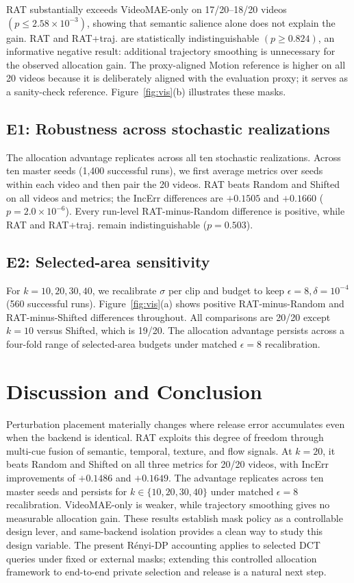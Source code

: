 RAT substantially exceeds VideoMAE-only on 17/20--18/20 videos
\((p\leq2.58{\times}10^{-3})\), showing that semantic salience alone does not
explain the gain. RAT and RAT+traj. are statistically indistinguishable
\((p\geq0.824)\), an informative negative result: additional trajectory
smoothing is unnecessary for the observed allocation gain. The proxy-aligned
Motion reference is higher on all 20 videos because it is deliberately aligned
with the evaluation proxy; it serves as a sanity-check reference. Figure~\ref{fig:vis}(b)
illustrates these masks.

\subsection{E1: Robustness across stochastic realizations}
\label{sec:e1}

The allocation advantage replicates across all ten stochastic realizations.
Across ten master seeds (1,400 successful runs), we first average metrics over
seeds within each video and then pair the 20 videos. RAT beats Random and
Shifted on all videos and metrics; the IncErr differences are \(+0.1505\) and
\(+0.1660\) (\(p=2.0{\times}10^{-6}\)). Every run-level RAT-minus-Random
difference is positive, while RAT and RAT+traj. remain indistinguishable
(\(p=0.503\)).

\subsection{E2: Selected-area sensitivity}
\label{sec:e2}

For \(k=10,20,30,40\), we recalibrate \(\sigma\) per clip and budget to keep
\(\epsilon=8,\delta=10^{-4}\) (560 successful runs). Figure~\ref{fig:vis}(a)
shows positive RAT-minus-Random and RAT-minus-Shifted differences throughout.
All comparisons are 20/20 except \(k=10\) versus Shifted, which is 19/20.
The allocation advantage persists across a four-fold range of selected-area
budgets under matched \(\epsilon=8\) recalibration.

\section{Discussion and Conclusion}
\label{sec:discussion}

Perturbation placement materially changes where release error accumulates even
when the backend is identical. RAT exploits this degree of freedom through
multi-cue fusion of semantic, temporal, texture, and flow signals. At \(k=20\),
it beats Random and Shifted on all three metrics for 20/20 videos, with IncErr
improvements of \(+0.1486\) and \(+0.1649\). The advantage replicates across
ten master seeds and persists for \(k\in\{10,20,30,40\}\) under matched
\(\epsilon=8\) recalibration. VideoMAE-only is weaker, while trajectory
smoothing gives no measurable allocation gain. These results establish mask
policy as a controllable design lever, and same-backend isolation provides a
clean way to study this design variable. The present R\'enyi-DP accounting
applies to selected DCT queries under fixed or external masks; extending this
controlled allocation framework to end-to-end private selection and release is
a natural next step.

